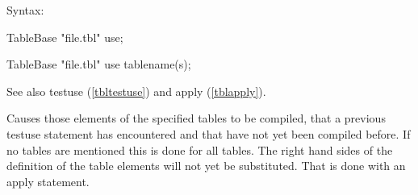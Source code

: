 \noindent Syntax:

TableBase "file.tbl" use;

TableBase "file.tbl" use tablename(s);

\noindent See also testuse (\ref{tbltestuse}) and apply (\ref{tblapply}).

\noindent Causes those elements of the specified tables to be 
compiled, that a previous testuse statement has encountered 
and that have not yet been compiled before. If no tables are mentioned this 
is done for all tables. The right hand sides of the definition of the table 
elements will not yet be substituted. That is done with an 
apply statement.


